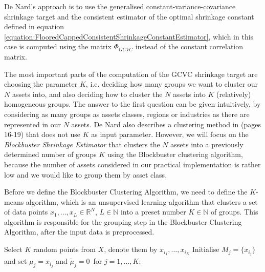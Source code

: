         De Nard's approach is to use the generalised constant-variance-covariance shrinkage target and the consistent estimator of the optimal shrinkage constant defined in equation \ref{equation:FlooredCappedConsistentShrinkageConstantEstimator}, which in this case is computed using the matrix $\Phi_{GCVC}$ instead of the constant correlation matrix.
        
        The most important parts of the computation of the GCVC shrinkage target are choosing the parameter $K$, i.e. deciding how many groups we want to cluster our $N$ assets into, and also deciding how to cluster the $N$ assets into $K$ (relatively) homogeneous groups. The answer to the first question can be given intuitively, by considering as many groups as assets classes, regions or industries as there are represented in our $N$ assets. De Nard also describes a clustering method in \cite{denard} (pages 16-19) that does not use $K$ as input parameter. However, we will focus on the \textit{Blockbuster Shrinkage Estimator} that clusters the $N$ assets into a previously determined number of groups $K$ using the Blockbuster clustering algorithm, because the number of assets considered in our practical implementation is rather low and we would like to group them by asset class.
        
        Before we define the Blockbuster Clustering Algorithm, we need to define the $K$-means algorithm, which is an unsupervised learning algorithm that clusters a set of data points $x_1, \dots, x_L \in \mathbb{R}^N$, $L \in \mathbb{N}$ into a preset number $K \in \mathbb{N}$ of groups. This algorithm is responsible for the grouping step in the Blockbuster Clustering Algorithm, after the input data is preprocessed.
        
        \begin{algorithm}[H]
            \SetAlgoLined
            
            Select $K$ random points from $X$, denote them by $x_{i_1}, \dots, x_{i_K}$\;
            Initialise $M_j = \{ x_{i_j} \}$ and set  $\mu_j = x_{i_j}$ and $\tilde{\mu}_j = 0$\ for $j=1, \dots, K$;
            \caption{$K$-means}
        \end{algorithm}
        
